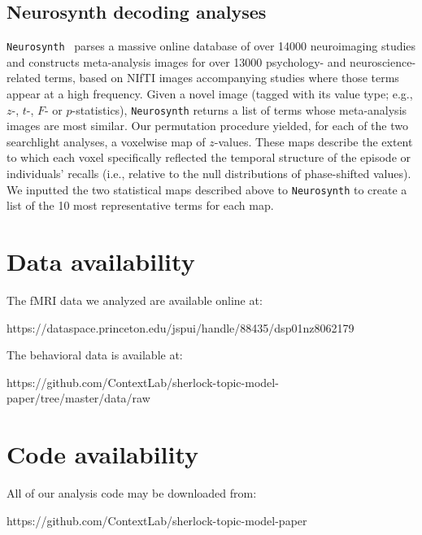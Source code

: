 \documentclass[10pt]{article}
\begin{document}
\subsection*{Neurosynth decoding analyses}
\texttt{Neurosynth}~\citep{YarkEtal11} parses a massive online database of over 14000 neuroimaging studies and constructs meta-analysis images for over 13000 psychology- and neuroscience-related terms, based on NIfTI images accompanying studies where those terms appear at a high frequency.  Given a novel image (tagged with its value type; e.g., $z$-, $t$-, $F$- or $p$-statistics), \texttt{Neurosynth} returns a list of terms whose meta-analysis images are most similar.  Our permutation procedure yielded, for each of the two searchlight analyses, a voxelwise map of $z$-values.  These maps describe the extent to which each voxel specifically reflected the temporal structure of the episode or individuals' recalls (i.e., relative to the null distributions of phase-shifted values). We inputted the two statistical maps described above to \texttt{Neurosynth} to create a list of the 10 most representative terms for each map.

\section*{Data availability}
The fMRI data we analyzed are available online at:

https://dataspace.princeton.edu/jspui/handle/88435/dsp01nz8062179

\noindent The behavioral data is available at:

https://github.com/ContextLab/sherlock-topic-model-paper/tree/master/data/raw

\section*{Code availability}
All of our analysis code may be downloaded from:

https://github.com/ContextLab/sherlock-topic-model-paper

%
%
\end{document}
